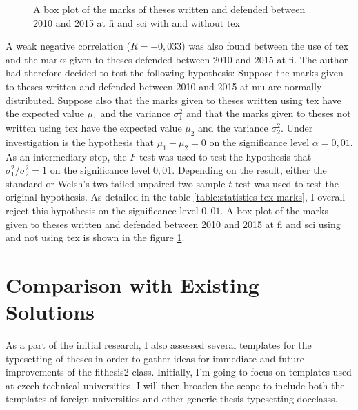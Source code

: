 \begin{figure}
    \caption{A box plot of the marks of theses written and defended between 2010 and 2015 at \gls{fi} and \gls{sci} with and without \gls{tex}}
    \label{fig:statistics-marks}
  \end{figure}

  A weak negative correlation ($R=-0{,}033$) was also found between the use of \gls{tex} and the marks given to theses defended between 2010 and 2015 at \gls{fi}. The author had therefore decided to test the following \gls{hypothesis}: Suppose the marks given to theses written and defended between 2010 and 2015 at \gls{mu} are normally distributed. Suppose also that the marks given to theses written using \gls{tex} have the expected value $\mu_1$ and the variance $\sigma_1^2$ and that the marks given to theses not written using \gls{tex} have the expected value $\mu_2$ and the variance $\sigma_2^2$. Under investigation is the \gls{hypothesis} that $\mu_1-\mu_2=0$ on the significance level $\alpha=0{,}01$. As an intermediary step, the $F$-test was used to test the \gls{hypothesis} that $\sigma_1^2/\sigma_2^2=1$ on the significance level $0{,}01$. Depending on the result, either the standard or Welsh's two-tailed unpaired two-sample $t$-test was used to test the original \gls{hypothesis}. As detailed in the table \ref{table:statistics-tex-marks}, I overall reject this \gls{hypothesis} on the significance level $0{,}01$. A box plot of the marks given to theses written and defended between 2010 and 2015 at \gls{fi} and \gls{sci} using and not using \gls{tex} is shown in the figure \ref{fig:statistics-marks}.

  \section{Comparison with Existing Solutions}
  As a part of the initial research, I also assessed several templates for the typesetting of theses in order to gather ideas for immediate and future improvements of the fithesis2 class. Initially, I'm going to focus on templates used at czech technical universities. I will then broaden the scope to include both the templates of foreign universities and other generic thesis typesetting \glspl{docclass}.

